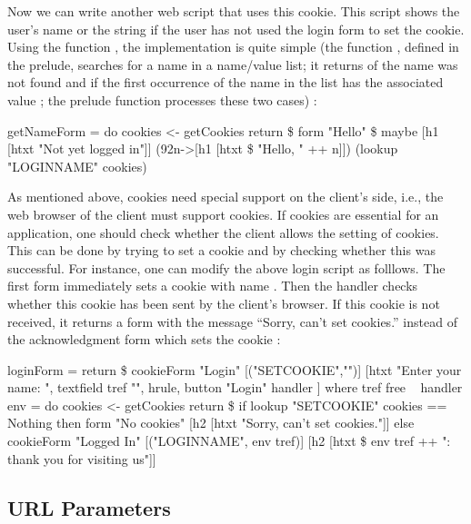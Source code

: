 Now we can write another web script that uses this cookie.
This script shows the user's name or the string
 if the user has not used the
login form to set the cookie.
Using the function , the implementation
is quite simple (the function , defined in the
prelude, searches for a name in a name/value list;
it returns  of the name was not found and
 if the first occurrence of the name in the list
has the associated value ; the prelude function
 processes these two cases)
:
\begin{prog}
getNameForm = do
  cookies <- getCookies
  return \$ form "Hello" \$
   maybe [h1 [htxt "Not yet logged in"]]
         (\char92n->[h1 [htxt \$ "Hello, " ++ n]])
         (lookup "LOGINNAME" cookies)
\end{prog}
%
As mentioned above, cookies need special support on the client's
side, i.e., the web browser of the client must support cookies.
If cookies are essential for an application, one should check
whether the client allows the setting of cookies.
This can be done by trying to set a cookie and by checking
whether this was successful. For instance, one can modify
the above login script as folllows.
The first form immediately sets a cookie with name .
Then the handler checks whether this cookie has been sent by the
client's browser. If this cookie is not received, it returns a form
with the message ``Sorry, can't set cookies.'' instead of the
acknowledgment form which sets the cookie 
:
\begin{prog}
loginForm = return \$ cookieForm "Login" [("SETCOOKIE","")]
  [htxt "Enter your name: ", textfield tref "",
   hrule,
   button "Login" handler
  ]
 where
   tref free
~
   handler env = do
     cookies <- getCookies
     return \$
       if lookup "SETCOOKIE" cookies == Nothing
       then form "No cookies" [h2 [htxt "Sorry, can't set cookies."]]
       else cookieForm "Logged In"
                       [("LOGINNAME", env tref)]
                       [h2 [htxt \$ env tref ++ ": thank you for visiting us"]]
\end{prog}


\subsection{URL Parameters}

